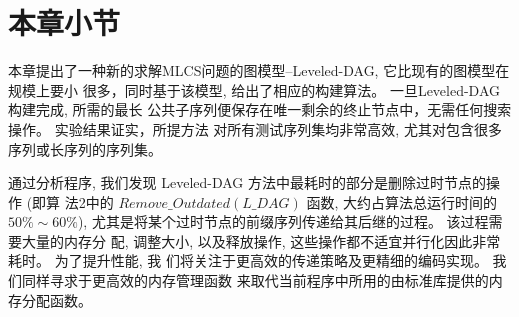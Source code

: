 \section{本章小节}
\label{sec:4_conculsion}

本章提出了一种新的求解MLCS问题的图模型--Leveled-DAG, 它比现有的图模型在规模上要小
很多，同时基于该模型, 给出了相应的构建算法。 一旦Leveled-DAG构建完成, 所需的最长
公共子序列便保存在唯一剩余的终止节点中，无需任何搜索操作。 实验结果证实，所提方法
对所有测试序列集均非常高效, 尤其对包含很多序列或长序列的序列集。

通过分析程序, 我们发现 Leveled-DAG 方法中最耗时的部分是删除过时节点的操作 (即算
法2中的 $Remove\_Outdated(L\_DAG)$ 函数, 大约占算法总运行时间的 $50\% \sim
60\%$), 尤其是将某个过时节点的前缀序列传递给其后继的过程。 该过程需要大量的内存分
配, 调整大小, 以及释放操作, 这些操作都不适宜并行化因此非常耗时。 为了提升性能, 我
们将关注于更高效的传递策略及更精细的编码实现。 我们同样寻求于更高效的内存管理函数
来取代当前程序中所用的由标准库提供的内存分配函数。



